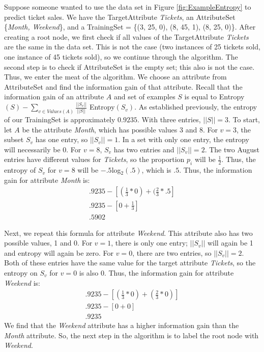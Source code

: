 Suppose someone wanted to use the data set in Figure \ref{fig:ExampleEntropy} to predict ticket sales. We have the TargetAttribute \textit{Tickets}, an AttributeSet \{\textit{Month, Weekend}\}, and a TrainingSet = \{(3, 25, 0), (8, 45, 1), (8, 25, 0)\}. After creating a root node, we first check if all values of the TargetAttribute \textit{Tickets} are the same in the data set. This is not the case (two instances of 25 tickets sold, one instance of 45 tickets sold), so we continue through the algorithm. The second step is to check if AttributeSet is the empty set; this also is not the case. Thus, we enter the meat of the algorithm. We choose an attribute from AttributeSet and find the information gain of that attribute. Recall that the information gain of an attribute $A$ and set of examples $S$ is equal to Entropy$(S)-\sum_{v\in Values(A)}\frac{||S_v||}{||S||}$ Entropy$(S_v)$. As established previously, the entropy of our TrainingSet is approximately $0.9235$. With three entries, $||S||=3$. To start, let $A$ be the attribute \textit{Month}, which has possible values 3 and 8. For $v=3$, the subset $S_v$ has one entry, so $||S_v||=1$. In a set with only one entry, the entropy will necessarily be 0. For $v=8$, $S_v$ has two entries and $||S_v||=2$. The two August entries have different values for \textit{Tickets}, so the proportion $p_i$ will be $\frac{1}{2}$. Thus, the entropy of $S_v$ for $v=8$ will be $-.5 $log$_2(.5)$, which is $.5$. Thus, the information gain for attribute \textit{Month} is:
\begin{align*}
  .9235 - [(\frac{1}{3}*0) + (\frac{2}{3}*.5]\\
  .9235 - [0 + \frac{1}{3}]\\
  .5902
\end{align*}

Next, we repeat this formula for attribute \textit{Weekend}. This attribute also has two possible values, 1 and 0. For $v=1$, there is only one entry; $||S_v||$ will again be 1 and entropy will again be zero. For $v=0$, there are two entries, so $||S_v||=2$. Both of these entries have the same value for the target attribute \textit{Tickets}, so the entropy on $S_v$ for $v=0$ is also 0. Thus, the information gain for attribute \textit{Weekend} is:
\begin{align*}
  .9235 - [(\frac{1}{3}*0) + (\frac{2}{3}*0)]\\
  .9235 - [0 + 0]\\
  .9235
\end{align*}
We find that the \textit{Weekend} attribute has a higher information gain than the \textit{Month} attribute. So, the next step in the algorithm is to label the root node with \textit{Weekend}. 

